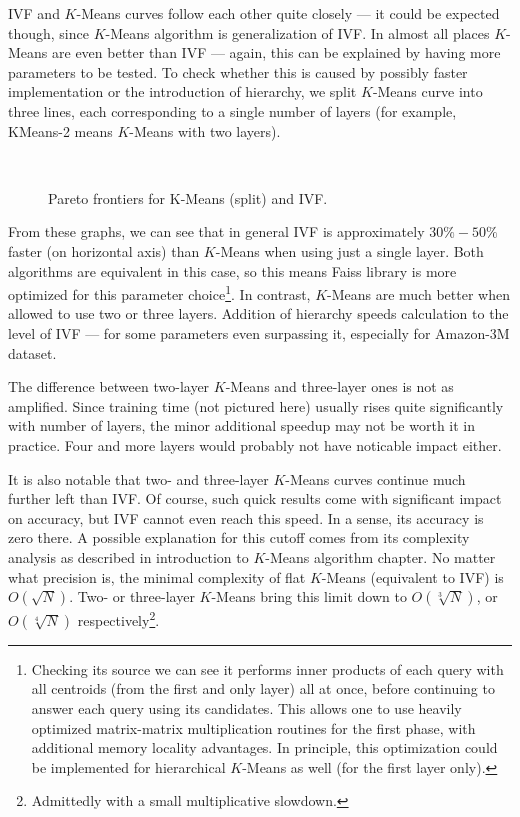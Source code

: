 IVF and $K$-Means curves follow each other quite closely --- it could be expected though,
since $K$-Means algorithm is generalization of IVF. In almost all places $K$-Means are even
better than IVF --- again, this can be explained by having more parameters to be tested.
To check whether this is caused by possibly faster implementation or the introduction of
hierarchy, we split $K$-Means curve into three lines, each corresponding to a single
number of layers (for example, KMeans-2 means $K$-Means with two layers).

\begin{figure}[H]
	\centering
	\\
	\caption{Pareto frontiers for K-Means (split) and IVF.}
\end{figure}

From these graphs, we can see that in general IVF is approximately $30\% - 50\%$ faster
(on horizontal axis) than $K$-Means when using just a single layer. Both algorithms are
equivalent in this case, so this means Faiss library is more optimized for this parameter 
choice\footnote{
Checking its source we can see it performs inner products of each query with all centroids
(from the first and only layer) all at once, before continuing to answer each query 
using its candidates. This allows one to use heavily optimized matrix-matrix multiplication
routines for the first phase, with additional memory locality advantages. 
In principle, this optimization
could be implemented for hierarchical $K$-Means as well (for the first layer only).
}.
In contrast, $K$-Means are much better when allowed to use two or three layers. Addition
of hierarchy speeds calculation to the level of IVF --- for some parameters even surpassing
it, especially for Amazon-3M dataset.

The difference between two-layer $K$-Means and three-layer ones is not as amplified. Since
training time (not pictured here) usually rises quite significantly with number of layers,
the minor additional speedup may not be worth it in practice. Four and more layers
would probably not have noticable impact either.

It is also notable that two- and three-layer $K$-Means curves continue much further left
than IVF. Of course, such quick results come with significant impact on accuracy, but
IVF cannot even reach this speed. In a sense, its accuracy is zero there.
A possible explanation for this cutoff comes from its complexity analysis as described
in introduction to $K$-Means algorithm chapter. No matter what precision is, the minimal
complexity of flat $K$-Means (equivalent to IVF) is $O(\sqrt{N})$. Two- or three-layer
$K$-Means bring this limit down to $O(\sqrt[3]{N})$, or $O(\sqrt[4]{N})$
respectively\footnote{Admittedly with a small multiplicative slowdown.}.

